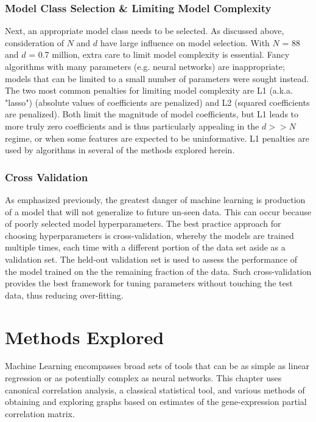 \subsubsection{Model Class Selection \& Limiting Model Complexity}
Next, an appropriate model class needs to be selected.
As discussed above, consideration of $N$ and $d$ have large influence on model selection.
With $N$ = 88 and $d$ = 0.7 million, extra care to limit model complexity is essential.
Fancy algorithms with many parameters (e.g. neural networks) are inappropriate; models that can be limited to a small number of parameters were sought instead.
The two most common penalties for limiting model complexity are L1 (a.k.a. "lasso") \cite{tibshirani1996} (absolute values of coefficients are penalized) and L2 \cite{hoerl1970} (squared coefficients are penalized).
Both limit the magnitude of model coefficients, but L1 leads to more truly zero coefficients \cite{tibshirani1996} and is thus particularly appealing in the $d >> N$ regime, or when some features are expected to be uninformative.
L1 penalties are used by algorithms in several of the methods explored herein.

\subsubsection{Cross Validation} %
As emphasized previously, the greatest danger of machine learning is production of a model that will not generalize to future un-seen data.
This can occur because of poorly selected model hyperparameters.
The best practice approach for choosing hyperparameters is cross-validation, whereby the models are trained multiple times, each time with a different portion of the data set aside as a validation set.
The held-out validation set is used to assess the performance of the model trained on the the remaining fraction of the data.
Such cross-validation provides the best framework for tuning parameters without touching the test data, thus reducing over-fitting.

\section{Methods Explored}
Machine Learning encompasses broad sets of tools that can be as simple as linear regression or as potentially complex as neural networks.
This chapter uses canonical correlation analysis, a classical statistical tool, and various methods of obtaining and exploring graphs based on estimates of the gene-expression partial correlation matrix.

